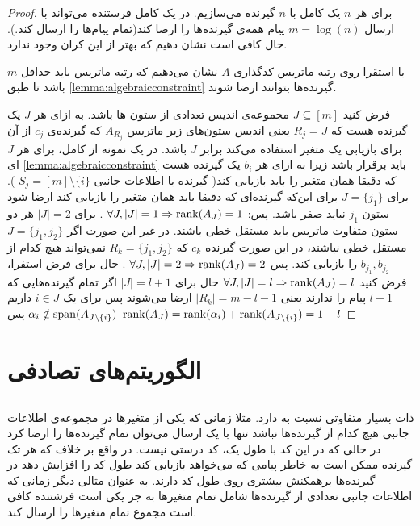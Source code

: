 \begin{proof}
	برای هر
	$n$
	یک 
	\picod
	کامل با
	$n$
	گیرنده می‌سازیم. در یک 
	\picod
	کامل فرستنده می‌تواند با ارسال
	$m = \log(n)$
	پیام همه‌ی گیرنده‌ها را ارضا کند(تمام پیام‌ها را ارسال کند.). حال کافی است نشان دهیم که بهتر از این کران وجود ندارد.
	
	با استقرا روی رتبه ماتریس کدگذاری 
	$A$
	نشان می‌دهیم که رتبه ماتریس باید حداقل 
	$m$
	باشد تا طبق
	\autoref{lemma:algebraicconstraint}
	گیرنده‌ها بتوانند ارضا شوند.
	
	فرض کنید
	$J \subseteq [m]$
	مجموعه‌ی اندیس تعدادی از ستون ها باشد. به ازای هر
	$J$
	یک گیرنده هست که 
	$R_j = J$
	یعنی اندیس ستون‌های زیر ماتریس
	$A_{R_j}$
	که گیرنده‌ی
	$c_j$
	از آن برای بازیابی یک متغیر استفاده می‌کند برابر
	$J$
	باشد. در یک نمونه از
	\picod
	کامل، برای هر
	$J$
	ای 
	\autoref{lemma:algebraicconstraint}
	باید برقرار باشد زیرا به ازای هر
	$b_i$
	یک گیرنده هست که دقیقا همان متغیر را باید بازیابی کند(
	گیرنده با اطلاعات جانبی
	$S_j = [m] \setminus \{i\}$
	). برای
	$J = \{j_1\}$
	برای این‌که گیرنده‌ای که دقیقا باید همان متغیر را بازیابی کند ارضا شود ستون
	$j_1$
	نباید صفر باشد. پس: 
	$\forall J, |J| = 1 \Rightarrow \operatorname{rank}(A_J) = 1$
	. برای
	$|J| = 2$
	هر دو ستون متفاوت ماتریس باید مستقل خطی باشند. در غیر این صورت اگر
	$J = \{j_1, j_2\}$
	مستقل خطی نباشند، در این صورت گیرنده‌
	$c_k$
	که
	$R_k = \{j_1, j_2\}$
	نمی‌تواند هیچ کدام از 
	$b_{j_1}, b_{j_2}$
	را بازیابی کند. پس 
	$\forall J, |J| = 2 \Rightarrow \operatorname{rank}(A_J) = 2$
	. حال برای فرض استفرا، فرض کنید
	$\forall J, |J| = l \Rightarrow \operatorname{rank}(A_J) = l$
	حال برای
	$|J| = l + 1$
	اگر تمام گیرنده‌هایی که
	$l + 1$
	پیام را ندارند یعنی
	$|R_k| = m - l - 1 $
	ارضا می‌شوند پس برای یک
	$i \in J$
	داریم
	$\alpha_i \notin \operatorname{span}(A_{J \setminus \{i\}})$
	پس
	$\operatorname{rank}(A_{J}) = \operatorname{rank}(\alpha_i) + \operatorname{rank}(A_{J \setminus \{i\}}) = 1 + l$
\end{proof}
\section{الگوریتم‌های تصادفی}
\subsection{ }
\picod
ذات بسیار متفاوتی نسبت به
\icod
دارد. مثلا زمانی که یکی از متغیرها در مجموعه‌ی اطلاعات جانبی هیچ کدام از گیرنده‌ها نباشد تنها با یک ارسال می‌توان تمام گیرنده‌ها را ارضا کرد در حالی که در
\icod
این کد با طول یک، کد درستی نیست. در واقع بر خلاف
\icod
که هر تک گیرنده ممکن است به خاطر پیامی که می‌خواهد بازیابی کند طول کد را افزایش دهد در
\picod
گیرنده‌ها برهمکنش بیشتری روی طول کد دارند. به عنوان مثالی دیگر زمانی که اطلاعات جانبی تعدادی از گیرنده‌ها شامل تمام متغیرها به جز یکی است فرشتنده کافی است مجموع تمام متغیرها را ارسال کند. 

